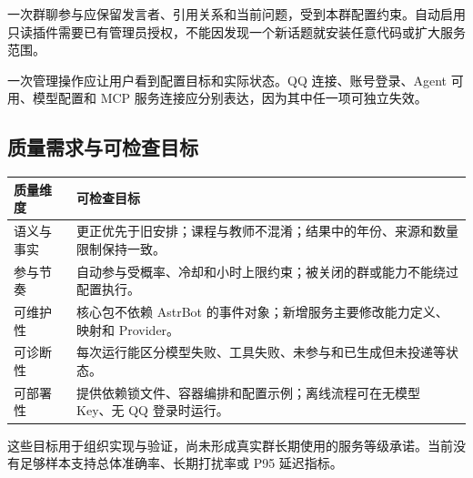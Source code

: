 一次群聊参与应保留发言者、引用关系和当前问题，受到本群配置约束。自动启用只读插件需要已有管理员授权，不能因发现一个新话题就安装任意代码或扩大服务范围。

一次管理操作应让用户看到配置目标和实际状态。QQ 连接、账号登录、Agent 可用、模型配置和 MCP 服务连接应分别表达，因为其中任一项可独立失效。

\subsection{质量需求与可检查目标}
\begin{tabularx}{\textwidth}{@{}L{24mm}Y@{}}\toprule
质量维度 & 可检查目标\\\midrule
语义与事实 & 更正优先于旧安排；课程与教师不混淆；结果中的年份、来源和数量限制保持一致。\\
参与节奏 & 自动参与受概率、冷却和小时上限约束；被关闭的群或能力不能绕过配置执行。\\
可维护性 & 核心包不依赖 AstrBot 的事件对象；新增服务主要修改能力定义、映射和 Provider。\\
可诊断性 & 每次运行能区分模型失败、工具失败、未参与和已生成但未投递等状态。\\
可部署性 & 提供依赖锁文件、容器编排和配置示例；离线流程可在无模型 Key、无 QQ 登录时运行。\\\bottomrule
\end{tabularx}

这些目标用于组织实现与验证，尚未形成真实群长期使用的服务等级承诺。当前没有足够样本支持总体准确率、长期打扰率或 P95 延迟指标。
